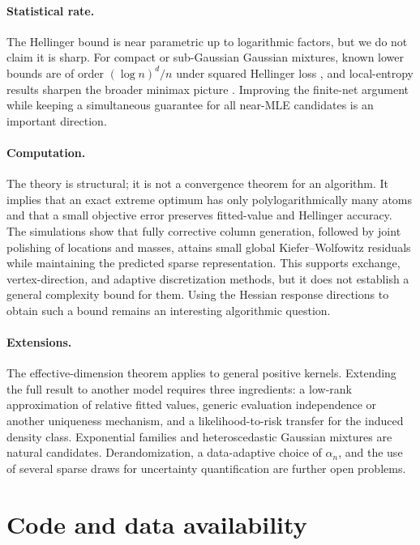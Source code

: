\documentclass[11pt]{article}
\theoremstyle{definition}
\theoremstyle{remark}
\begin{document}
\paragraph{Statistical rate.}
The Hellinger bound is near parametric up to logarithmic factors, but we do
not claim it is sharp.  For compact or sub-Gaussian Gaussian mixtures, known
lower bounds are of order $(\log n)^d/n$ under squared Hellinger loss
\citep{kimguntuboyina2022}, and local-entropy results sharpen the broader
minimax picture \citep{jiaetal2023}.  Improving the finite-net argument while
keeping a simultaneous guarantee for all near-MLE candidates is an important
direction.

\paragraph{Computation.}
The theory is structural; it is not a convergence theorem for an algorithm.
It implies that an exact extreme optimum has only polylogarithmically many
atoms and that a small objective error preserves fitted-value and Hellinger
accuracy.  The simulations show that fully corrective column generation,
followed by joint polishing of locations and masses, attains small global
Kiefer--Wolfowitz residuals while maintaining the predicted sparse
representation.  This supports exchange, vertex-direction, and adaptive
discretization methods, but it does not establish a general complexity bound
for them.  Using the Hessian response directions to obtain such a bound
remains an interesting algorithmic question.

\paragraph{Extensions.}
The effective-dimension theorem applies to general positive kernels.
Extending the full result to another model requires three ingredients: a
low-rank approximation of relative fitted values, generic evaluation
independence or another uniqueness mechanism, and a likelihood-to-risk
transfer for the induced density class.  Exponential families and
heteroscedastic Gaussian mixtures are natural candidates.  Derandomization, a
data-adaptive choice of $\alpha_n$, and the use of several sparse draws for
uncertainty quantification are further open problems.

\section*{Code and data availability}
\end{document}
